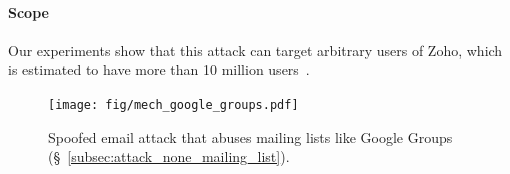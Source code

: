 

\paragraph{Scope}
Our experiments show that this attack can target arbitrary users of Zoho, which is estimated to have more than 10 million users~\cite{Celebrat69:online}.



\begin{figure}[t]
\centering
\texttt{[image: fig/mech\_google\_groups.pdf]}
\centering
\caption[Spoofed Email Attack Abusing Google Groups]{Spoofed email attack that abuses mailing lists like Google Groups (\S~\ref{subsec:attack_none_mailing_list}).}
\label{fig:google_groups_mech}
\end{figure}





